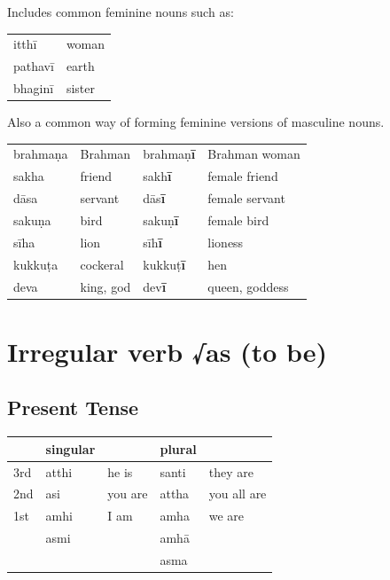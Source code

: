 \documentclass[11pt,oneside]{memoir}
\begin{document}
Includes common feminine nouns such as:

\begin{center}
\begin{tabular}{ll}
itthī & woman\\[0pt]
pathavī & earth\\[0pt]
bhaginī & sister\\[0pt]
\end{tabular}
\end{center}

Also a common way of forming feminine versions of masculine nouns.

\begin{center}
\begin{tabular}{llll}
brahmaṇa & Brahman & brahmaṇ\textbf{ī} & Brahman woman\\[0pt]
sakha & friend & sakh\textbf{ī} & female friend\\[0pt]
dāsa & servant & dās\textbf{ī} & female servant\\[0pt]
sakuṇa & bird & sakuṇ\textbf{ī} & female bird\\[0pt]
sīha & lion & sīh\textbf{ī} & lioness\\[0pt]
kukkuṭa & cockeral & kukkuṭ\textbf{ī} & hen\\[0pt]
deva & king, god & dev\textbf{ī} & queen, goddess\\[0pt]
\end{tabular}
\end{center}

\clearpage

\section{Irregular verb √as (to be)}
\label{sec:org059c251}
\subsection{Present Tense}
\label{sec:org8cb424d}

\begin{center}
\begin{tabular}{lllll}
 & singular &  & plural & \\[0pt]
\hline
3rd & atthi & he is & santi & they are\\[0pt]
2nd & asi & you are & attha & you all are\\[0pt]
1st & amhi & I am & amha & we are\\[0pt]
 & asmi &  & amhā & \\[0pt]
 &  &  & asma & \\[0pt]
\end{tabular}
\end{center}
\end{document}
